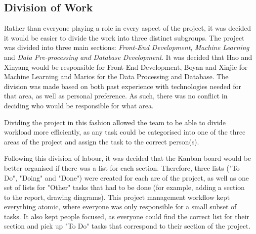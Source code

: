 \documentclass[titlepage]{article}
\begin{document}
\subsection{Division of Work}
Rather than everyone playing a role in every aspect of the project, it was decided it would be easier to divide the work into three distinct subgroups. The project was divided into three main sections: \textit{Front-End Development}, \textit{Machine Learning} and \textit{Data Pre-processing and Database Development}. It was decided that Hao and Xinyang would be responsible for Front-End Development, Boyan and Xinjie for Machine Learning and Marios for the Data Processing and Database. The division was made based on both past experience with technologies needed for that area, as well as personal preference. As such, there was no conflict in deciding who would be responsible for what area.

Dividing the project in this fashion allowed the team to be able to divide workload more efficiently, as any task could be categorised into one of the three areas of the project and assign the task to the correct person(s).

Following this division of labour, it was decided that the Kanban board would be better organised if there was a list for each section. Therefore, three lists ("To Do", "Doing" and "Done") were created for each are of the project, as well as one set of lists for "Other" tasks that had to be done (for example, adding a section to the report, drawing diagrams). This project management workflow kept everything atomic, where everyone was only responsible for a small subset of tasks. It also kept people focused, as everyone could find the correct list for their section and pick up "To Do" tasks that correspond to their section of the project.

\pagebreak
{}
 
\end{document}
